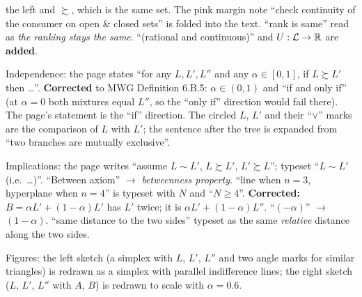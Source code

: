 \documentclass[11pt]{article}
\begin{document}
\begin{transcriptnotes}
        the left and $\succsim$, which is the same set. The pink margin note ``check
        continuity of the consumer on open \& closed sets'' is folded into the text.
        ``rank is same'' read as \emph{the ranking stays the same}. ``(rational and
        continuous)'' and $U:\mathcal{L}\to\mathbb{R}$ are \textbf{added}.
  \item Independence: the page states ``for any $L,L',L''$ and any $\alpha\in[0,1]$,
        if $L\succsim L'$ then \ldots''. \textbf{Corrected} to MWG Definition 6.B.5:
        $\alpha\in(0,1)$ and ``if and only if'' (at $\alpha=0$ both mixtures equal
        $L''$, so the ``only if'' direction would fail there). The page's statement is
        the ``if'' direction. The circled $L$, $L'$ and their ``$\vee$'' marks are the
        comparison of $L$ with $L'$; the sentence after the tree is expanded from
        ``two branches are mutually exclusive''.
  \item Implications: the page writes ``assume $L\sim L'$, $L\succsim L'$, $L'\succsim
        L$''; typeset ``$L\sim L'$ (i.e.\ \ldots)''. ``Between axiom'' $\to$
        \emph{betweenness property}. ``line when $n=3$, hyperplane when $n=4$'' is
        typeset with $N$ and ``$N\ge 4$''. \textbf{Corrected:} $B=\alpha L'+(1-\alpha)L'$
        has $L'$ twice; it is $\alpha L'+(1-\alpha)L''$. ``$(-\alpha)$'' $\to$
        $(1-\alpha)$. ``same distance to the two sides'' typeset as the same
        \emph{relative} distance along the two sides.
  \item Figures: the left sketch (a simplex with $L$, $L'$, $L''$ and two angle marks
        for similar triangles) is redrawn as a simplex with parallel indifference
        lines; the right sketch ($L$, $L'$, $L''$ with $A$, $B$) is redrawn to scale
        with $\alpha=0.6$.
\end{transcriptnotes}
\end{document}
